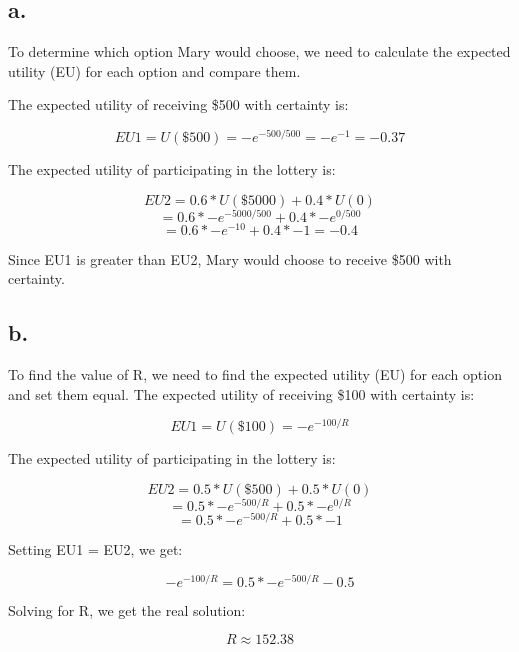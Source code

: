\documentclass{article}
\begin{document}
\subsection*{a.}

To determine which option Mary would choose, we need to calculate the expected utility (EU) for each option and compare them.

The expected utility of receiving \$500 with certainty is:

\[EU1 = U(\$500) = -e^{-500/500} = -e^{-1} = -0.37\]

The expected utility of participating in the lottery is:

\[EU2 = 0.6 * U(\$5000) + 0.4 * U(0)\]
\[= 0.6 * -e^{-5000/500} + 0.4 * -e^{0/500}\]
\[= 0.6 * -e^{-10} + 0.4 * -1 = -0.4\]

Since EU1 is greater than EU2, Mary would choose to receive \$500 with certainty.

\subsection*{b.}

To find the value of R, we need to find the expected utility (EU) for each option and set them equal. The expected utility of receiving \$100 with certainty is:

\[EU1 = U(\$100) = -e^{-100/R}\]

The expected utility of participating in the lottery is:

\[EU2 = 0.5 * U(\$500) + 0.5 * U(0)\]
\[= 0.5 * -e^{-500/R} + 0.5 * -e^{0/R}\] 
\[= 0.5 * -e^{-500/R} + 0.5 * -1\]

Setting EU1 = EU2, we get:

\[-e^{-100/R} = 0.5 * -e^{-500/R} -0.5\]

Solving for R, we get the real solution:

\[R \approx 152.38\]
\end{document}
